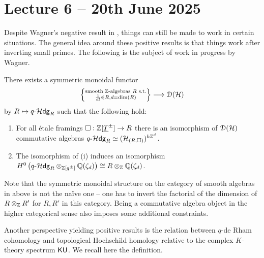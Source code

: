 \section{Lecture 6 -- 20th June 2025}\label{sec: lecture 6}
Despite Wagner's negative result in , things can still be made to work in certain situations. The general idea around these positive results is that things work after inverting small primes. The following is the subject of work in progress by Wagner. 
\begin{conjecture}[Wagner]\label{conj: Wagner primes up to dimension inverted}
    There exists a symmetric monoidal functor 
    $$\left\{\substack{\textrm{smooth }\mathbb{Z}\textrm{-algebras }R\textrm{ s.t.} \\ \frac{1}{d!}\in R, d=\dim(R)}\right\}\longrightarrow\EuScript{D}(\mathcal{H})$$
    by $R\mapsto q\text{-}\mathcal{H}\mathsf{dg}_{R}$ such that the following hold:
    \begin{enumerate}[label=(\roman*)]
        \item For all \'{e}tale framings $\square:\mathbb{Z}[\underline{T}^{\pm}]\to R$ there is an isomorphism of $\EuScript{D}(\mathcal{H})$ commutative algebras $q\text{-}\mathcal{H}\mathsf{dg}_{R}\simeq(\mathcal{H}_{(R,\square)})^{h\mathbb{Z}^{d}}$. 
        \item The isomorphism of (i) induces an isomorphism $H^{0}\left(q\text{-}\mathcal{H}\mathsf{dg}_{R}\otimes_{\mathbb{Z}[q^{\pm}]}\mathbb{Q}(\zeta_{d})\right)\cong R\otimes_{\mathbb{Z}}\mathbb{Q}(\zeta_{d})$. 
    \end{enumerate}
\end{conjecture}
\begin{remark}
    Note that the symmetric monoidal structure on the category of smooth algebras in  above is not the na\"{i}ve one -- one has to invert the factorial of the dimension of $R\otimes_{\mathbb{Z}}R'$ for $R,R'$ in this category. Being a commutative algebra object in the higher categorical sense also imposes some additional constraints. 
\end{remark}
Another perspective yielding positive results is the relation between $q$-de Rham cohomology and topological Hochschild homology relative to the complex $K$-theory spectrum $\mathsf{KU}$. We recall here the definition. 
